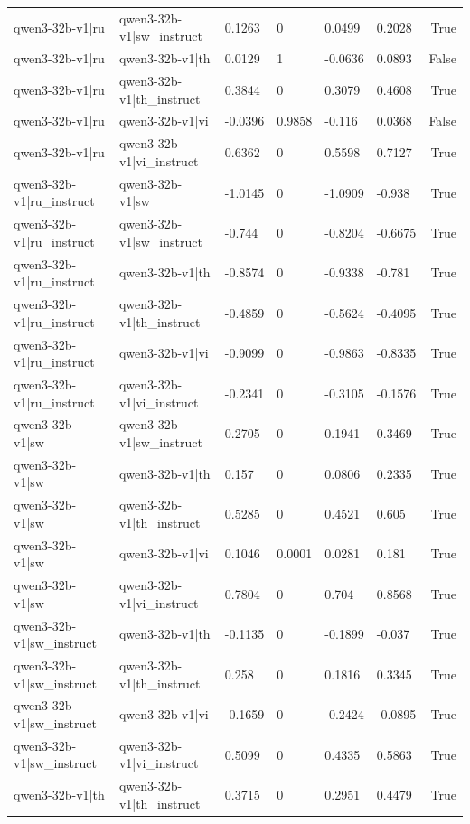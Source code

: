 \begin{table}
\begin{tabular}{llllllr}
qwen3-32b-v1|ru & qwen3-32b-v1|sw_instruct & 0.1263 & 0 & 0.0499 & 0.2028 & True \\
qwen3-32b-v1|ru & qwen3-32b-v1|th & 0.0129 & 1 & -0.0636 & 0.0893 & False \\
qwen3-32b-v1|ru & qwen3-32b-v1|th_instruct & 0.3844 & 0 & 0.3079 & 0.4608 & True \\
qwen3-32b-v1|ru & qwen3-32b-v1|vi & -0.0396 & 0.9858 & -0.116 & 0.0368 & False \\
qwen3-32b-v1|ru & qwen3-32b-v1|vi_instruct & 0.6362 & 0 & 0.5598 & 0.7127 & True \\
qwen3-32b-v1|ru_instruct & qwen3-32b-v1|sw & -1.0145 & 0 & -1.0909 & -0.938 & True \\
qwen3-32b-v1|ru_instruct & qwen3-32b-v1|sw_instruct & -0.744 & 0 & -0.8204 & -0.6675 & True \\
qwen3-32b-v1|ru_instruct & qwen3-32b-v1|th & -0.8574 & 0 & -0.9338 & -0.781 & True \\
qwen3-32b-v1|ru_instruct & qwen3-32b-v1|th_instruct & -0.4859 & 0 & -0.5624 & -0.4095 & True \\
qwen3-32b-v1|ru_instruct & qwen3-32b-v1|vi & -0.9099 & 0 & -0.9863 & -0.8335 & True \\
qwen3-32b-v1|ru_instruct & qwen3-32b-v1|vi_instruct & -0.2341 & 0 & -0.3105 & -0.1576 & True \\
qwen3-32b-v1|sw & qwen3-32b-v1|sw_instruct & 0.2705 & 0 & 0.1941 & 0.3469 & True \\
qwen3-32b-v1|sw & qwen3-32b-v1|th & 0.157 & 0 & 0.0806 & 0.2335 & True \\
qwen3-32b-v1|sw & qwen3-32b-v1|th_instruct & 0.5285 & 0 & 0.4521 & 0.605 & True \\
qwen3-32b-v1|sw & qwen3-32b-v1|vi & 0.1046 & 0.0001 & 0.0281 & 0.181 & True \\
qwen3-32b-v1|sw & qwen3-32b-v1|vi_instruct & 0.7804 & 0 & 0.704 & 0.8568 & True \\
qwen3-32b-v1|sw_instruct & qwen3-32b-v1|th & -0.1135 & 0 & -0.1899 & -0.037 & True \\
qwen3-32b-v1|sw_instruct & qwen3-32b-v1|th_instruct & 0.258 & 0 & 0.1816 & 0.3345 & True \\
qwen3-32b-v1|sw_instruct & qwen3-32b-v1|vi & -0.1659 & 0 & -0.2424 & -0.0895 & True \\
qwen3-32b-v1|sw_instruct & qwen3-32b-v1|vi_instruct & 0.5099 & 0 & 0.4335 & 0.5863 & True \\
qwen3-32b-v1|th & qwen3-32b-v1|th_instruct & 0.3715 & 0 & 0.2951 & 0.4479 & True \\

\end{tabular}
\end{table}
